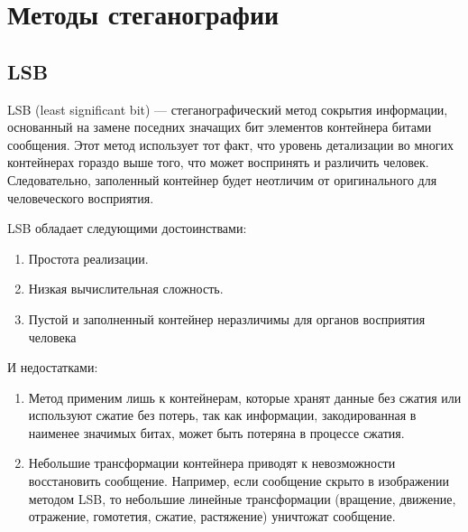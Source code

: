 \chapter{Методы стеганографии}
\section{LSB}
LSB (least significant bit) --- стеганографический метод сокрытия информации, основанный на замене поседних значащих бит
элементов контейнера битами сообщения. Этот метод использует тот факт,
что уровень детализации во многих контейнерах гораздо выше того,
что может воспринять и различить человек. Следовательно,
заполенный контейнер будет неотличим от оригинального
для человеческого восприятия.

LSB обладает следующими достоинствами:
\begin{enumerate}
    \item Простота реализации.
    \item Низкая вычислительная сложность.
    \item Пустой и заполненный контейнер неразличимы для органов восприятия человека
\end{enumerate}
И недостатками:
\begin{enumerate}
    \item Метод применим лишь к контейнерам, которые хранят данные без сжатия или используют
    сжатие без потерь, так как информации, закодированная в наименее значимых битах, может
    быть потеряна в процессе сжатия.
    \item Небольшие трансформации контейнера приводят к невозможности восстановить сообщение.
    Например, если сообщение скрыто в изображении методом LSB, то небольшие линейные трансформации
    (вращение, движение, отражение, гомотетия, сжатие, растяжение) уничтожат сообщение.
\end{enumerate}

